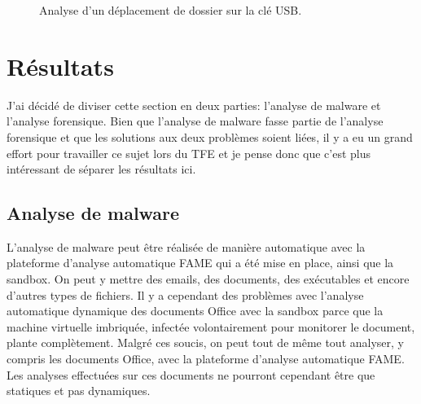 \begin{figure}
    \centering
    \caption{Analyse d'un déplacement de dossier sur la clé USB.}
    \label{fig:autopsy-moved-folders}
\end{figure}





\section{Résultats}

J'ai décidé de diviser cette section en deux parties: l'analyse de malware et l'analyse forensique. Bien que l'analyse de malware fasse partie de l'analyse forensique et que les solutions aux deux problèmes soient liées, il y a eu un grand effort pour travailler ce sujet lors du TFE et je pense donc que c'est plus intéressant de séparer les résultats ici.



\subsection{Analyse de malware}

L'analyse de malware peut être réalisée de manière automatique avec la plateforme d'analyse automatique FAME qui a été mise en place, ainsi que la sandbox. On peut y mettre des emails, des documents, des exécutables et encore d'autres types de fichiers. Il y a cependant des problèmes avec l'analyse automatique dynamique des documents Office avec la sandbox parce que la machine virtuelle imbriquée, infectée volontairement pour monitorer le document, plante complètement. Malgré ces soucis, on peut tout de même tout analyser, y compris les documents Office, avec la plateforme d'analyse automatique FAME. Les analyses effectuées sur ces documents ne pourront cependant être que statiques et pas dynamiques.

